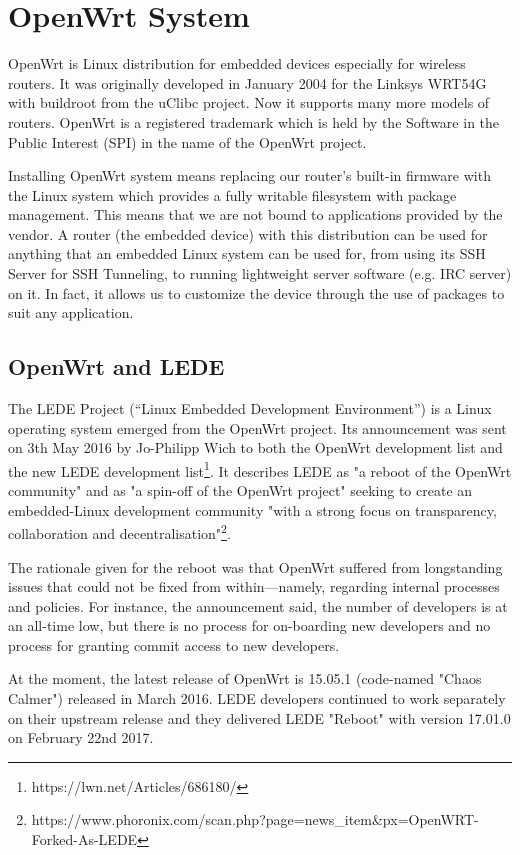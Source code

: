 \section{OpenWrt System}\label{owrt}
OpenWrt is Linux distribution for embedded devices especially for wireless routers.
It was originally developed in January 2004 for the Linksys WRT54G with buildroot from the uClibc project.
Now it supports many more models of routers.
OpenWrt is a registered trademark which is held by the Software in the Public Interest (SPI) in the name of the OpenWrt project.

Installing OpenWrt system means replacing our router’s built-in firmware with the Linux system which provides a fully writable filesystem with package management.
This means that we are not bound to applications provided by the vendor.
A router (the embedded device) with this distribution can be used for anything that an embedded Linux system can be used for, from using its SSH Server for SSH Tunneling, to running lightweight server software (e.g. IRC server) on it.
In fact, it allows us to customize the device through the use of packages to suit any application. \cite{openwrt}



\subsection{OpenWrt and LEDE}

The LEDE Project (“Linux Embedded Development Environment”) is a Linux operating system emerged from the OpenWrt project.
Its announcement was sent on 3th May 2016 by Jo-Philipp Wich to both the OpenWrt development list and the new LEDE development list\footnote{https://lwn.net/Articles/686180/}.
It describes LEDE as "a reboot of the OpenWrt community" and as "a spin-off of the OpenWrt project" seeking to create an embedded-Linux development community "with a strong focus on transparency, collaboration and decentralisation"\footnote{https://www.phoronix.com/scan.php?page=news\_item\&px=OpenWRT-Forked-As-LEDE}.

The rationale given for the reboot was that OpenWrt suffered from longstanding issues that could not be fixed from within—namely, regarding internal processes and policies.
For instance, the announcement said, the number of developers is at an all-time low, but there is no process for on-boarding new developers and no process for granting commit access to new developers.

At the moment, the latest release of OpenWrt is 15.05.1 (code-named "Chaos Calmer") released in March 2016.
LEDE developers continued to work separately on their upstream release and they delivered LEDE "Reboot" with version 17.01.0 on February 22nd 2017.

